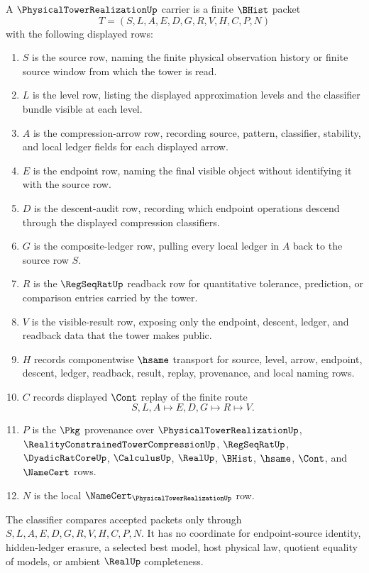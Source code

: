 \begin{definition}
\label{def:physical-tower-realization-carrier}
A $\PhysicalTowerRealizationUp$ carrier is a finite $\BHist$ packet
$$
T=(S,L,A,E,D,G,R,V,H,C,P,N)
$$
with the following displayed rows:
\begin{enumerate}
\item $S$ is the source row, naming the finite physical observation history or finite source window from which the tower is read.
\item $L$ is the level row, listing the displayed approximation levels and the classifier bundle visible at each level.
\item $A$ is the compression-arrow row, recording source, pattern, classifier, stability, and local ledger fields for each displayed arrow.
\item $E$ is the endpoint row, naming the final visible object without identifying it with the source row.
\item $D$ is the descent-audit row, recording which endpoint operations descend through the displayed compression classifiers.
\item $G$ is the composite-ledger row, pulling every local ledger in $A$ back to the source row $S$.
\item $R$ is the $\RegSeqRatUp$ readback row for quantitative tolerance, prediction, or comparison entries carried by the tower.
\item $V$ is the visible-result row, exposing only the endpoint, descent, ledger, and readback data that the tower makes public.
\item $H$ records componentwise $\hsame$ transport for source, level, arrow, endpoint, descent, ledger, readback, result, replay, provenance, and local naming rows.
\item $C$ records displayed $\Cont$ replay of the finite route
$$
S,L,A \longmapsto E,D,G \longmapsto R \longmapsto V .
$$
\item $P$ is the $\Pkg$ provenance over $\PhysicalTowerRealizationUp$, $\RealityConstrainedTowerCompressionUp$, $\RegSeqRatUp$, $\DyadicRatCoreUp$, $\CalculusUp$, $\RealUp$, $\BHist$, $\hsame$, $\Cont$, and $\NameCert$ rows.
\item $N$ is the local $\NameCert_{\PhysicalTowerRealizationUp}$ row.
\end{enumerate}
The classifier compares accepted packets only through $S,L,A,E,D,G,R,V,H,C,P,N$. It has no coordinate for endpoint-source identity, hidden-ledger erasure, a selected best model, host physical law, quotient equality of models, or ambient $\RealUp$ completeness.
\end{definition}

